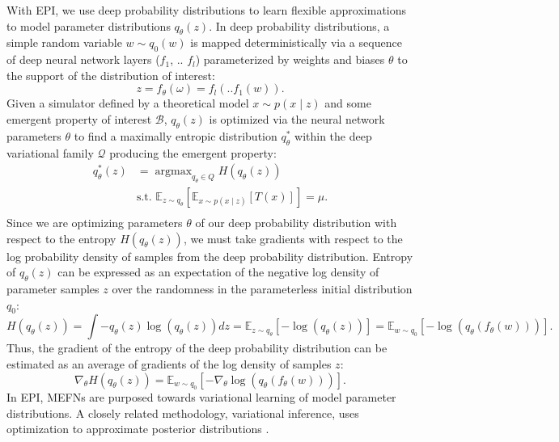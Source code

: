 \documentclass[11pt]{article}
\DeclareMathOperator*{\argmax}{argmax}
\begin{document}
With EPI, we use deep probability distributions to learn flexible approximations to model parameter distributions $q_\theta(z)$.
 In deep probability distributions, a simple random variable $w \sim q_0(w)$ is mapped deterministically via a sequence of deep neural network layers ($f_1$, .. $f_l$) parameterized by weights and biases $\theta$ to the support of the distribution of interest:
\begin{equation}
z = f_{\theta}(\omega) = f_l(..f_1(w)).
\end{equation}
Given a simulator defined by a theoretical model $x \sim p(x \mid z)$ and some emergent property of interest $\mathcal{B}$, $q_\theta(z)$ is optimized via the neural network parameters $\theta$ to find a maximally entropic distribution $q_{\theta}^*$ within the deep variational family $\mathcal{Q}$ producing the emergent property:
\begin{equation} \label{eq:opt}
\begin{split}
q_\theta^*(z) &= \argmax_{q_\theta \in Q} H(q_\theta(z)) \\
 &  \text{s.t.  } \mathbb{E}_{z \sim q_\theta}\left[ \mathbb{E}_{x\sim p(x \mid z)}\left[T(x)\right] \right] = \mu. \\
 \end{split}
\end{equation} 
Since we are optimizing parameters $\theta$ of our deep probability distribution with respect to the entropy $H(q_\theta(z))$, we must take gradients with respect to the log probability density of samples from the deep probability distribution.  Entropy of $q_\theta(z)$ can be expressed as an expectation of the negative log density of parameter samples $z$ over the randomness in the parameterless initial distribution $q_0$:
\begin{equation}
H(q_\theta(z)) = \int - q_\theta(z) \log(q_\theta(z)) dz = \mathbb{E}_{z \sim q_\theta}\left[-\log(q_\theta(z)) \right] = \mathbb{E}_{w \sim q_0}\left[-\log(q_\theta(f_\theta(w))) \right].
\end{equation}
Thus, the gradient of the entropy of the deep probability distribution can be estimated as an average of gradients of the log density of samples $z$:
\begin{equation}
\nabla_\theta H(q_\theta(z)) = \mathbb{E}_{w \sim q_0}\left[- \nabla_\theta \log(q_\theta(f_\theta(w))) \right].
\end{equation}
In EPI, MEFNs are purposed towards variational learning of model parameter distributions.  
A closely related methodology, variational inference, uses optimization to approximate posterior distributions \cite{blei2017variational}.
\end{document}
